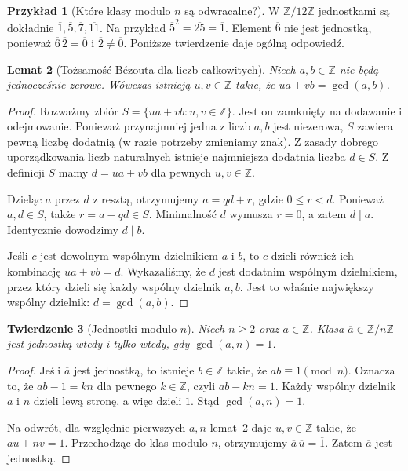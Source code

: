 \documentclass[11pt,a4paper,openany]{report}
\numberwithin{equation}{section}
\theoremstyle{plain}
\newtheorem{twierdzenie}{Twierdzenie}[section]
\newtheorem{lemat}[twierdzenie]{Lemat}
\theoremstyle{definition}
\newtheorem{przyklad}[twierdzenie]{Przykład}
\theoremstyle{remark}
\newcommand{\Z}{\mathbb Z}
\begin{document}
\begin{przyklad}[Które klasy modulo $n$ są odwracalne?]
W $\Z/12\Z$ jednostkami są dokładnie
$\overline1,\overline5,\overline7,\overline{11}$.
Na przykład $\overline5^2=\overline{25}=\overline1$.
Element $\overline6$ nie jest jednostką, ponieważ
$\overline6\,\overline2=\overline0$ i $\overline2\ne\overline0$.
Poniższe twierdzenie daje ogólną odpowiedź.
\end{przyklad}

\begin{lemat}[Tożsamość Bézouta dla liczb całkowitych]
\label{lem:bezout-int}
Niech $a,b\in\Z$ nie będą jednocześnie zerowe. Wówczas istnieją
$u,v\in\Z$ takie, że $ua+vb=\gcd(a,b)$.
\end{lemat}
\begin{proof}
Rozważmy zbiór $S=\{ua+vb:u,v\in\Z\}$.
Jest on zamknięty na dodawanie i odejmowanie. Ponieważ przynajmniej
jedna z liczb $a,b$ jest niezerowa, $S$ zawiera pewną liczbę dodatnią
(w razie potrzeby zmieniamy znak). Z zasady dobrego uporządkowania
liczb naturalnych istnieje najmniejsza dodatnia liczba $d\in S$.
Z definicji $S$ mamy $d=ua+vb$ dla pewnych $u,v\in\Z$.

Dzieląc $a$ przez $d$ z resztą, otrzymujemy $a=qd+r$,
gdzie $0\le r<d$. Ponieważ $a,d\in S$, także $r=a-qd\in S$.
Minimalność $d$ wymusza $r=0$, a zatem $d\mid a$.
Identycznie dowodzimy $d\mid b$.

Jeśli $c$ jest dowolnym wspólnym dzielnikiem $a$ i $b$,
to $c$ dzieli również ich kombinację $ua+vb=d$.
Wykazaliśmy, że $d$ jest dodatnim wspólnym dzielnikiem,
przez który dzieli się każdy wspólny dzielnik $a,b$.
Jest to właśnie największy wspólny dzielnik: $d=\gcd(a,b)$.
\end{proof}

\begin{twierdzenie}[Jednostki modulo $n$]
\label{tw:jednostki-mod}
Niech $n\ge2$ oraz $a\in\Z$. Klasa $\overline a\in\Z/n\Z$
jest jednostką wtedy i tylko wtedy, gdy $\gcd(a,n)=1$.
\end{twierdzenie}
\begin{proof}
Jeśli $\overline a$ jest jednostką, to istnieje $b\in\Z$ takie, że
$ab\equiv1\pmod n$. Oznacza to, że $ab-1=kn$ dla pewnego $k\in\Z$,
czyli $ab-kn=1$. Każdy wspólny dzielnik $a$ i $n$ dzieli lewą stronę,
a więc dzieli $1$. Stąd $\gcd(a,n)=1$.

Na odwrót, dla względnie pierwszych $a,n$ lemat~\ref{lem:bezout-int} daje $u,v\in\Z$ takie, że $au+nv=1$.
Przechodząc do klas modulo $n$, otrzymujemy
$\overline a\,\overline u=\overline1$. Zatem $\overline a$ jest jednostką.
\end{proof}
\end{document}
